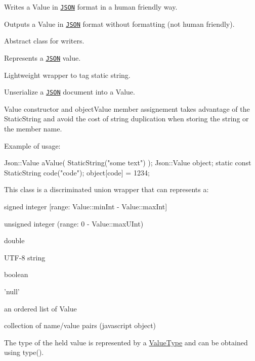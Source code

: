 Writes a Value in \href{http://www.json.org}{\tt J\-S\-O\-N} format in a human friendly way.

Outputs a Value in \href{http://www.json.org}{\tt J\-S\-O\-N} format without formatting (not human friendly).

Abstract class for writers.

Represents a \href{http://www.json.org}{\tt J\-S\-O\-N} value.

Lightweight wrapper to tag static string.

Unserialize a \href{http://www.json.org}{\tt J\-S\-O\-N} document into a Value.

\begin{DoxyVerb} \end{DoxyVerb}


Value constructor and object\-Value member assignement takes advantage of the Static\-String and avoid the cost of string duplication when storing the string or the member name.

Example of usage\-: 
\begin{DoxyCode}
 Json::Value aValue( StaticString("some text") );
 Json::Value object;
 static const StaticString code("code");
 object[code] = 1234;
\end{DoxyCode}


This class is a discriminated union wrapper that can represents a\-:
\begin{DoxyItemize}
\item signed integer \mbox{[}range\-: Value\-::min\-Int -\/ Value\-::max\-Int\mbox{]}
\item unsigned integer (range\-: 0 -\/ Value\-::max\-U\-Int)
\item double
\item U\-T\-F-\/8 string
\item boolean
\item 'null'
\item an ordered list of Value
\item collection of name/value pairs (javascript object)
\end{DoxyItemize}

The type of the held value is represented by a \hyperlink{namespace_json_a7d654b75c16a57007925868e38212b4e}{Value\-Type} and can be obtained using type().

